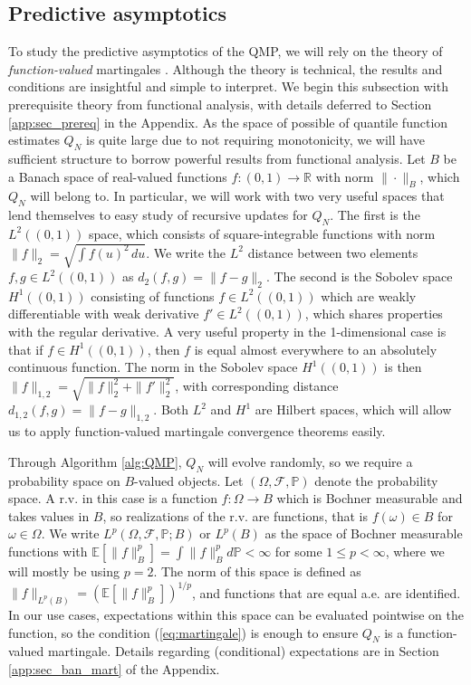 \documentclass[11pt,a4paper]{article}
\newcommand{\R}{\mathbb{R}}
\newcommand{\E}{\mathbb{E}}
\begin{document}
\subsection{Predictive asymptotics}
To study the predictive asymptotics of the QMP, we will rely on the theory of \textit{function-valued} martingales \citep{Pisier2016}. Although the theory is  technical, the results and conditions are  insightful and simple to interpret.
We begin this subsection with prerequisite theory from functional analysis, with details deferred to Section \ref{app:sec_prereq} in the Appendix. As the space of possible  of quantile function {estimates} $Q_N$ is quite large due to not requiring monotonicity, we will have sufficient structure to borrow powerful results from functional analysis. Let $B$ be a Banach space of real-valued functions $f:(0,1) \to \R$ with norm $\|\cdot \|_B$, which $Q_N$ will belong to. In particular, we will work with two very useful spaces that lend themselves to easy study of recursive updates for $Q_N$. The first is the $L^2((0,1))$ space, which consists of square-integrable functions with norm $\|f\|_{2} = \sqrt{\int f(u)^2 \, du}$. 
We write the $L^2$ distance between two elements $f, g\in L^2((0,1))$ as $d_2(f,g) = \|f-g\|_2$. The second is the Sobolev space $H^1((0,1))$ consisting of functions $f \in L^2((0,1))$  which are weakly differentiable with weak derivative $f' \in L^2((0,1))$, which shares properties with the regular derivative. 
A very useful property in the 1-dimensional case is that if $f \in H^1((0,1))$, then $f$ is equal almost everywhere to an absolutely continuous function. 
The norm in the Sobolev space $H^1((0,1))$ is then
$\|f\|_{1,2} = \sqrt{\| f\|_2^2 + \|f'\|_2^2}$, with corresponding distance $d_{1,2}(f,g) = \|f-g\|_{1,2}$. Both $L^2$ and $H^1$ are Hilbert spaces, which will allow us to apply function-valued martingale convergence theorems easily.

Through {Algorithm \ref{alg:QMP}}, $Q_N$ will evolve randomly, so we require a probability space on $B$-valued objects. Let $(\Omega,\mathcal{F},\mathbb{P})$ denote the probability space. A r.v. in this case is a function $f: \Omega \to B$ which is Bochner measurable and takes values in $B$, so realizations of the r.v. are functions, that is $f(\omega)\in B$ for $\omega \in \Omega$. We write $L^p\left(\Omega, \mathcal{F}, \mathbb{P}; B\right)$ or $L^p(B)$ as the space of  Bochner measurable functions with $\E\left[\|f\|_B^p\right] =\int \|f\|_B^p d\mathbb{P} < \infty$ for some $1 \leq p < \infty$, where we will mostly be using $p = 2$. The norm of this space is defined as $\|f\|_{L^p(B)} = \left(\E\left[ \|f\|_B^p \right]\right)^{1/p}$, and functions that are equal a.e. are identified. In our use cases, expectations within this  space can be evaluated pointwise on the function, so
the condition (\ref{eq:martingale}) is enough to ensure $Q_N$ is a function-valued martingale. Details regarding (conditional) expectations are in Section \ref{app:sec_ban_mart} of the Appendix. 
\end{document}
